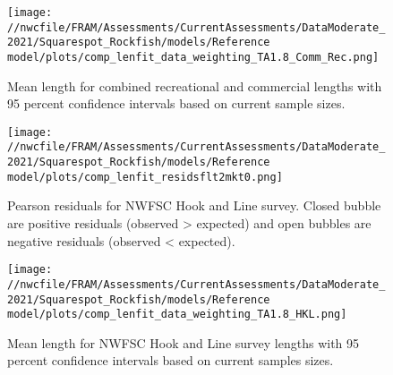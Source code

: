 \documentclass[11pt,
  english,
  a4paper,
]{article}
\begin{document}
\tagmcend\tagstructend


\begin{figure}
\centering
\texttt{[image: //nwcfile/FRAM/Assessments/CurrentAssessments/DataModerate\_2021/Squarespot\_Rockfish/models/Reference model/plots/comp\_lenfit\_data\_weighting\_TA1.8\_Comm\_Rec.png]}
\caption{Mean length for combined recreational and commercial lengths with 95 percent confidence intervals based on current sample sizes.\label{fig:rec-com-mean-len-fit}}
\end{figure}

\tagmcend\tagstructend


\begin{figure}
\centering
\texttt{[image: //nwcfile/FRAM/Assessments/CurrentAssessments/DataModerate\_2021/Squarespot\_Rockfish/models/Reference model/plots/comp\_lenfit\_residsflt2mkt0.png]}
\caption{Pearson residuals for NWFSC Hook and Line survey. Closed bubble are positive residuals (observed \textgreater{} expected) and open bubbles are negative residuals (observed \textless{} expected).\label{fig:hkl-pearson}}
\end{figure}

\tagmcend\tagstructend


\begin{figure}
\centering
\texttt{[image: //nwcfile/FRAM/Assessments/CurrentAssessments/DataModerate\_2021/Squarespot\_Rockfish/models/Reference model/plots/comp\_lenfit\_data\_weighting\_TA1.8\_HKL.png]}
\caption{Mean length for NWFSC Hook and Line survey lengths with 95 percent confidence intervals based on current samples sizes.\label{fig:hkl-mean-len-fit}}
\end{figure}

\tagmcend\tagstructend
\end{document}
